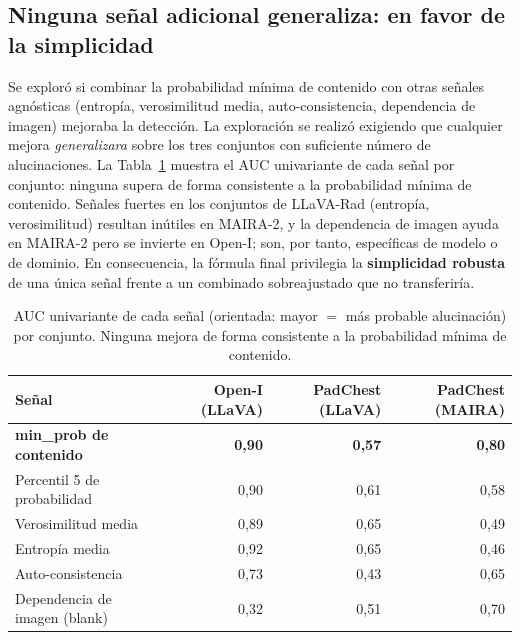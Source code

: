 \subsection{Ninguna señal adicional generaliza: en favor de la simplicidad}
Se exploró si combinar la probabilidad mínima de contenido con otras señales agnósticas (entropía,
verosimilitud media, auto-consistencia, dependencia de imagen) mejoraba la detección. La exploración
se realizó exigiendo que cualquier mejora \emph{generalizara} sobre los tres conjuntos con suficiente
número de alucinaciones. La Tabla~\ref{tab:senales} muestra el AUC univariante de cada señal por
conjunto: ninguna supera de forma consistente a la probabilidad mínima de contenido. Señales fuertes
en los conjuntos de LLaVA-Rad (entropía, verosimilitud) resultan inútiles en MAIRA-2, y la dependencia
de imagen ayuda en MAIRA-2 pero se invierte en Open-I; son, por tanto, específicas de modelo o de
dominio. En consecuencia, la fórmula final privilegia la \textbf{simplicidad robusta} de una única
señal frente a un combinado sobreajustado que no transferiría.

\begin{table}[t]\centering
\caption{AUC univariante de cada señal (orientada: mayor $=$ más probable alucinación) por conjunto.
Ninguna mejora de forma consistente a la probabilidad mínima de contenido.}
\label{tab:senales}
\begin{tabular}{lrrr}
\toprule
Señal & Open-I (LLaVA) & PadChest (LLaVA) & PadChest (MAIRA) \\ \midrule
\textbf{min\_prob de contenido} & \textbf{0,90} & \textbf{0,57} & \textbf{0,80} \\
Percentil 5 de probabilidad & 0,90 & 0,61 & 0,58 \\
Verosimilitud media & 0,89 & 0,65 & 0,49 \\
Entropía media & 0,92 & 0,65 & 0,46 \\
Auto-consistencia & 0,73 & 0,43 & 0,65 \\
Dependencia de imagen (blank) & 0,32 & 0,51 & 0,70 \\ \bottomrule
\end{tabular}
\end{table}

